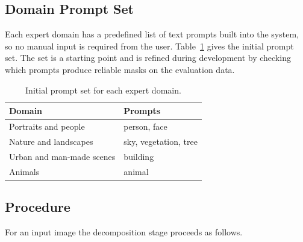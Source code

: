 \documentclass{FastFyp}
\begin{document}
\subsection{Domain Prompt Set}

Each expert domain has a predefined list of text prompts built into the system, so no manual input is required from the user. Table~\ref{tab:prompts} gives the initial prompt set. The set is a starting point and is refined during development by checking which prompts produce reliable masks on the evaluation data.

\begin{table}[htbp]
    \centering
    \caption{Initial prompt set for each expert domain.}
    \label{tab:prompts}
    \begin{tabular}{p{4cm}p{9cm}}
        \hline
        \textbf{Domain} & \textbf{Prompts} \\
        \hline
        Portraits and people & person, face \\
        Nature and landscapes & sky, vegetation, tree\\
        Urban and man-made scenes & building \\
        Animals & animal\\
        \hline
    \end{tabular}
\end{table}

\subsection{Procedure}

For an input image the decomposition stage proceeds as follows.
\end{document}
